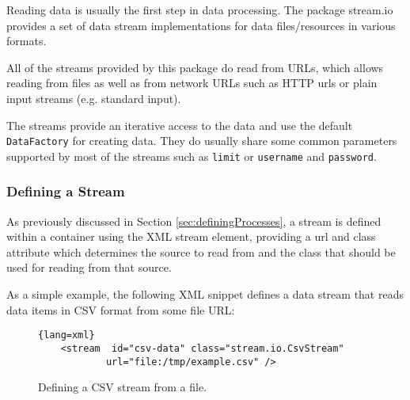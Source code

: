 
Reading data is usually the first step in data processing. The package
{\ttfamily stream.io} provides a set of data stream implementations
for data files/resources in various formats.

All of the streams provided by this package do read from URLs, which
allows reading from files as well as from network URLs such as HTTP
urls or plain input streams (e.g. standard input).

The streams provide an iterative access to the data and use the default
\texttt{DataFactory} for creating data. They do usually share some
common parameters supported by most of the streams such as
\texttt{limit} or \texttt{username} and \texttt{password}.

\subsubsection*{Defining a Stream}
As previously discussed in Section \ref{sec:definingProcesses}, a
stream is defined within a container using the XML {\ttfamily stream}
element, providing a {\ttfamily url} and {\ttfamily class} attribute
which determines the source to read from and the class that should
be used for reading from that source.

As a simple example, the following XML snippet defines a data stream
that reads data items in CSV format from some file URL:
\begin{figure}[h!]
\begin{center}
\begin{lstlisting}{lang=xml}
    <stream  id="csv-data" class="stream.io.CsvStream"
            url="file:/tmp/example.csv" />
\end{lstlisting}
\end{center}
\caption{Defining a CSV stream from a file.}
\end{figure}











%
%
%
%
%
%
%
%
%
%
%
